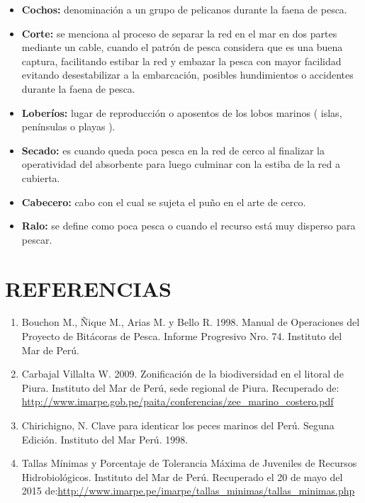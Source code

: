 \documentclass[a4paper,oneside,11pt]{book}
\begin{document}
\begin{itemize}
\item{\textbf{Cochos:}} denominación a un grupo de pelicanos durante la faena de pesca.

\item{\textbf{Corte:}} se menciona al proceso de separar la red en el mar en dos partes mediante un cable, cuando el patrón de pesca considera que es una buena captura, facilitando estibar   la red y embazar la pesca con mayor facilidad evitando desestabilizar a la embarcación, posibles hundimientos  o accidentes durante la faena de pesca. 

\item{\textbf{Loberíos:}} lugar de reproducción o aposentos de  los lobos marinos ( islas, penínsulas o playas ).

\item  {\textbf{Secado:}}  es cuando queda poca pesca en la red de cerco al finalizar  la operatividad del absorbente para luego culminar  con la estiba de la red a cubierta.

\item {\textbf{Cabecero:}} cabo con el cual se sujeta el puño en el arte de cerco.

\item{\textbf{Ralo:}} se define como poca pesca  o  cuando el recurso está muy disperso para pescar. 

\end{itemize}

\chapter{REFERENCIAS}
\begin{enumerate}
\item Bouchon M., Ñique M., Arias M. y Bello R. 1998. Manual de Operaciones del Proyecto de Bitácoras de Pesca. Informe Progresivo Nro. 74. Instituto del Mar de Perú.
\item Carbajal Villalta W. 2009. Zonificación de la biodiversidad en el litoral de Piura. Instituto del Mar de Perú, sede regional de Piura. Recuperado de: \url{http://www.imarpe.gob.pe/paita/conferencias/zee_marino_costero.pdf} 
\item Chirichigno, N. Clave para identicar los peces marinos del Perú. Seguna Edición. Instituto del Mar Perú. 1998.
\item Tallas Mínimas y Porcentaje de Tolerancia Máxima de Juveniles de Recursos Hidrobiológicos. Instituto del Mar de Perú. Recuperado el 20 de mayo del 2015 de:\url{http://www.imarpe.pe/imarpe/tallas_minimas/tallas_minimas.php}


\end{enumerate}
\end{document}
